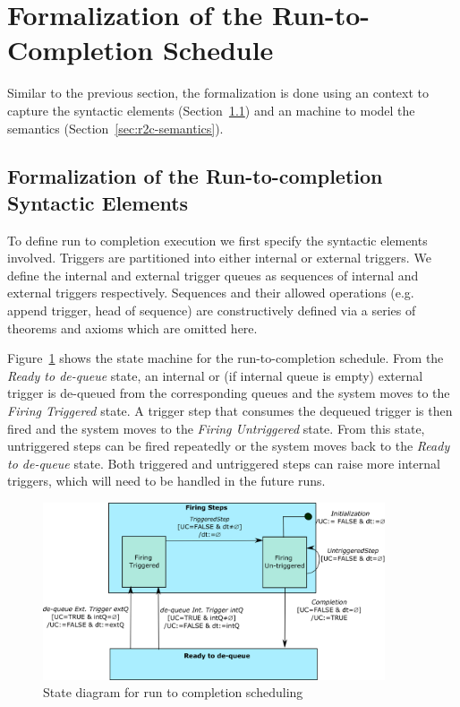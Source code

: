 \section{Formalization of the Run-to-Completion Schedule}
\label{sec:r2c}
Similar to the previous section, the formalization is done using an \EventB context to capture the syntactic elements (Section~\ref{sec:r2c-syntax}) and an \EventB machine to model the semantics (Section~\ref{sec:r2c-semantics}).

\subsection{Formalization of the Run-to-completion Syntactic Elements}
\label{sec:r2c-syntax}
To define run to completion execution we first specify the  syntactic elements involved. 
Triggers are partitioned into either internal or external triggers.
We define the internal and external trigger queues as sequences of internal and external triggers respectively. Sequences and their allowed operations (e.g. append trigger, head of sequence) are constructively defined via a series of theorems and axioms which are omitted here.

Figure~\ref{fig:run-to-completion} shows the state machine for the run-to-completion schedule. 
From the \emph{Ready to de-queue} state, an internal or (if internal queue is empty) external trigger is de-queued from the corresponding queues and the system moves to the \emph{Firing Triggered} state.
A trigger step that consumes the dequeued trigger is then fired and the system moves to the \emph{Firing Untriggered} state. 
From this state, untriggered steps can be fired repeatedly or the system moves back to the \emph{Ready to de-queue} state. 
Both triggered and untriggered steps can raise more internal triggers, which will need to be handled in the future runs.
\begin{figure}[!t]
\centering
\includegraphics[width=0.9\textwidth]{figures/run-to-completion.png}
\caption{State diagram for run to completion scheduling}
\label{fig:run-to-completion}
\end{figure}

